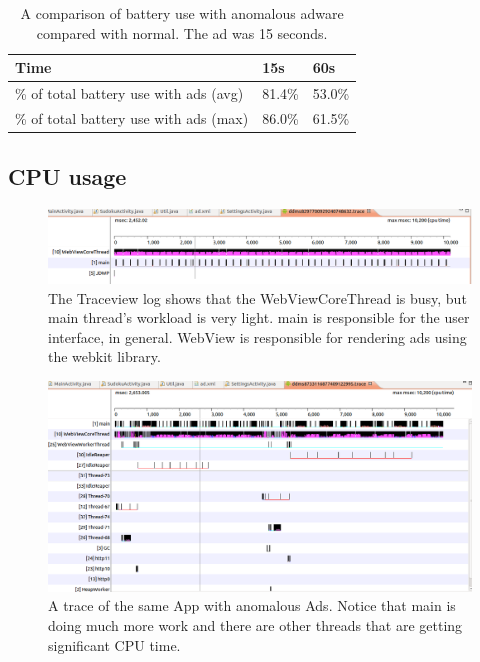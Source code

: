 \begin{table}%
\centering 
\scriptsize
\caption{A comparison of battery use with anomalous adware compared with normal.
The ad was 15 seconds.}
\label{table:battery}
\begin{tabular}{|l||l|l|}
    \hline
    {\bf Time} & {\bf 15s} & {\bf 60s}  \\
    \hline
    \% of total battery use with ads (avg)  & 81.4\%   & 53.0\%    \\
    \hline
    \% of total battery use with ads (max) & 86.0\%  & 61.5\%   \\
    \hline 
\end{tabular}

\end{table}

\subsection{CPU usage}

\begin{figure}[ht]
\centering
\includegraphics[width=6.5in]{no_AdsDisplay_10s.png}
\caption{The Traceview log shows that the
WebViewCoreThread is busy, but main thread's workload is very light.  main is responsible for 
the user interface, in general.  WebView is responsible for rendering ads using the webkit library.}
\label{fig:cpu-no-ad}
\end{figure}

\begin{figure}[ht]
\centering
\includegraphics[width=6.5in]{traceview.png}
\caption{A trace of the same App with anomalous Ads.  Notice that main is doing much more work and
there are other threads that are getting significant CPU time.}
\label{fig:cpu-ad}
\end{figure}

